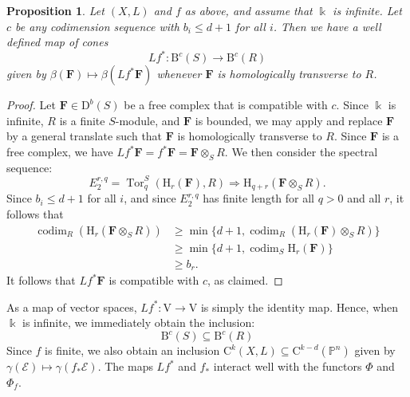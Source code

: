 \documentclass[12pt]{amsart}
\newtheorem{prop}[lemma]{Proposition}
\theoremstyle{definition}
\theoremstyle{remark}
\newcommand{\Spec}{\operatorname{Spec}}
\newcommand{\Tor}{\operatorname{Tor}}
\newcommand{\kk}{\Bbbk}
\newcommand{\codim}{\operatorname{codim}}
\newcommand{\PP}{\mathbb{P}}
\newcommand{\HH}{\mathrm{H}}
\newcommand{\ZZ}{\mathbb{Z}}
\newcommand{\VV}{\mathrm{V}}
\newcommand{\WW}{\mathrm{W}}
\newcommand{\cc}{c}
\newcommand{\cO}{\mathcal{O}}
\newcommand{\cE}{\mathcal{E}}
\newcommand{\FF}{\mathbf{F}}
\newcommand{\DD}{\mathrm{D}}
\newcommand{\CQ}{\mathrm{C}}
\newcommand{\BBQ}{\mathrm{B}}
\begin{document}
 \begin{prop}\label{prop:pushpull}
Let $(X,L)$ and $f$ as above, and assume that $\kk$ is infinite.
Let $\cc$ be any codimension sequence with $b_i\leq d+1$ for all $i$.   Then we have a well defined map of cones
	\[
Lf^*\colon \BBQ^{\cc}(S)\to \BBQ^{\cc}(R)
\]
given by $\beta(\FF)\mapsto \beta(Lf^*\FF)$ whenever $\FF$ is homologically transverse to $R$.  


\end{prop}
\begin{proof}
Let $\FF\in \DD^b(S)$ be a free complex that is compatible with $\cc$.  Since $\kk$ is infinite, $R$ is a finite $S$-module, and $\FF$ is bounded, we may apply \cite[Theorem, p.\ 335]{miller-speyer} and replace $\FF$ by a general translate such that $\FF$ is homologically transverse to $R$. Since $\FF$ is a free complex, we have $Lf^*\FF=f^*\FF=\FF\otimes_S R$.   We then consider the spectral sequence:
\[
E^{r,q}_2=\Tor^S_{q}(\HH_r(\FF),R)\Rightarrow \HH_{q+r}(\FF\otimes_S R).
\]
Since $b_i\leq d+1$ for all $i$, and since $E^{r,q}_2$ has finite length for all $q>0$ and all $r$, it follows that
\begin{align*}
\codim_R \left(\HH_{r}(\FF\otimes_S R)\right) &\geq \min\{d+1, \codim_R\left( \HH_r(\FF)\otimes_S R\right)\} \\
&\geq \min\{d+1, \codim_S \HH_r(\FF)\}\\
& \geq b_r.
\end{align*}
It follows that $Lf^*\FF$ is compatible with $\cc$, as claimed.
\end{proof}

As a map of vector spaces, $Lf^*\colon \VV\to \VV$ 
is simply the identity map.  Hence, when $\kk$ is infinite, we immediately obtain the inclusion:
\[
\BBQ^{\cc}(S)\subseteq \BBQ^{\cc}(R) 
\]
Since $f$ is finite, we also obtain an inclusion $\CQ^k(X,L)\subseteq \CQ^{k-d}(\PP^n)$ given by $\gamma(\cE)\mapsto \gamma(f_*\cE)$.  
The maps $Lf^*$ and $f_*$ interact well with the functors $\Phi$ and $\Phi_f$.
\end{document}
